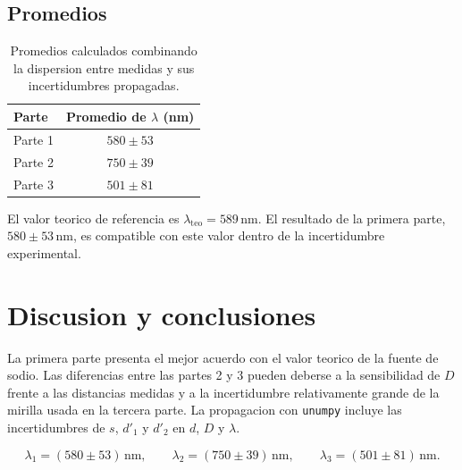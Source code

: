 \documentclass[a4paper,11pt]{article}
\begin{document}
\subsection{Promedios}
\begin{table}[H]
\centering
\begin{tabular}{lc}
\toprule
\textbf{Parte} & \textbf{Promedio de $\lambda$ (nm)} \\
\midrule
Parte 1 & $580\pm53$ \\
Parte 2 & $750\pm39$ \\
Parte 3 & $501\pm81$ \\
\bottomrule
\end{tabular}
\caption{Promedios calculados combinando la dispersion entre medidas y sus incertidumbres propagadas.}
\label{tab:promedios}
\end{table}

El valor teorico de referencia es $\lambda_\mathrm{teo}=589\,\mathrm{nm}$.
El resultado de la primera parte, $580\pm53\,\mathrm{nm}$, es compatible con
este valor dentro de la incertidumbre experimental.

\section{Discusion y conclusiones}
La primera parte presenta el mejor acuerdo con el valor teorico de la fuente de
sodio. Las diferencias entre las partes 2 y 3 pueden deberse a la sensibilidad
de $D$ frente a las distancias medidas y a la incertidumbre relativamente grande
de la mirilla usada en la tercera parte. La propagacion con \texttt{unumpy} incluye
las incertidumbres de $s$, $d'_1$ y $d'_2$ en $d$, $D$ y $\lambda$.

\begin{equation}
\lambda_1 = (580\pm53)\,\mathrm{nm}, \qquad
\lambda_2 = (750\pm39)\,\mathrm{nm}, \qquad
\lambda_3 = (501\pm81)\,\mathrm{nm}.
\end{equation}
\end{document}
